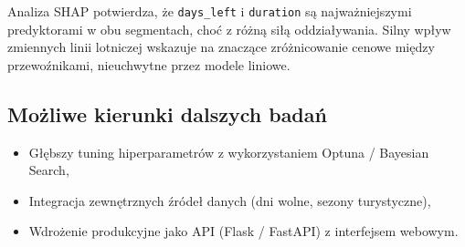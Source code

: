 \documentclass[12pt,a4paper]{article}
\begin{document}
	Analiza SHAP potwierdza, że \texttt{days\_left} i \texttt{duration} są
	najważniejszymi predyktorami w obu segmentach, choć z różną siłą oddziaływania.
	Silny wpływ zmiennych linii lotniczej wskazuje na znaczące zróżnicowanie cenowe
	między przewoźnikami, nieuchwytne przez modele liniowe.
	
	\subsection{Możliwe kierunki dalszych badań}
	
	\begin{itemize}
		\item Głębszy tuning hiperparametrów z wykorzystaniem Optuna / Bayesian Search,
		\item Integracja zewnętrznych źródeł danych (dni wolne, sezony turystyczne),
		\item Wdrożenie produkcyjne jako API (Flask / FastAPI) z interfejsem webowym.
	\end{itemize}
	
\end{document}
